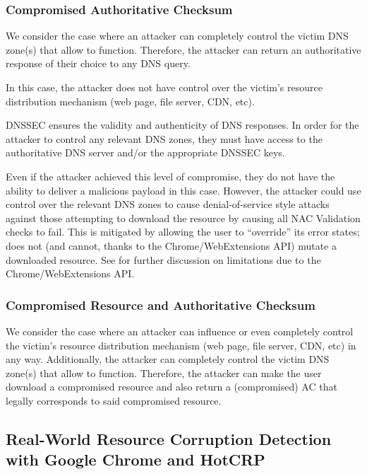\subsubsection{Compromised Authoritative Checksum}

We consider the case where an attacker can completely control the victim DNS
zone(s) that allow \SYSTEM{} to function. Therefore, the attacker can return an
authoritative response of their choice to any DNS query.

In this case, the attacker does not have control over the victim's resource
distribution mechanism (web page, file server, CDN, etc).

DNSSEC ensures the validity and authenticity of DNS responses. In order for the
attacker to control any relevant DNS zones, they must have access to the
authoritative DNS server and/or the appropriate DNSSEC keys.

Even if the attacker achieved this level of compromise, they do not have the
ability to deliver a malicious payload in this case. However, the attacker
could use control over the relevant DNS zones to cause denial-of-service style
attacks against those attempting to download the resource by causing all NAC
Validation checks to fail. This is mitigated by \SYSTEM{} allowing the user to
``override'' its error states; \ie \SYSTEM{} does not (and cannot, thanks to
the Chrome/WebExtensions API) mutate a downloaded resource. See
 for further discussion on limitations due to the
Chrome/WebExtensions API.

\subsubsection{Compromised Resource and Authoritative Checksum}

We consider the case where an attacker can influence or even completely control
the victim's resource distribution mechanism (web page, file server, CDN, etc)
in any way. Additionally, the attacker can completely control the victim DNS
zone(s) that allow \SYSTEM{} to function. Therefore, the attacker can make the
user download a compromised resource and also return a (compromised) AC that
legally corresponds to said compromised resource.

\subsection{Real-World Resource Corruption Detection with Google Chrome and HotCRP}

